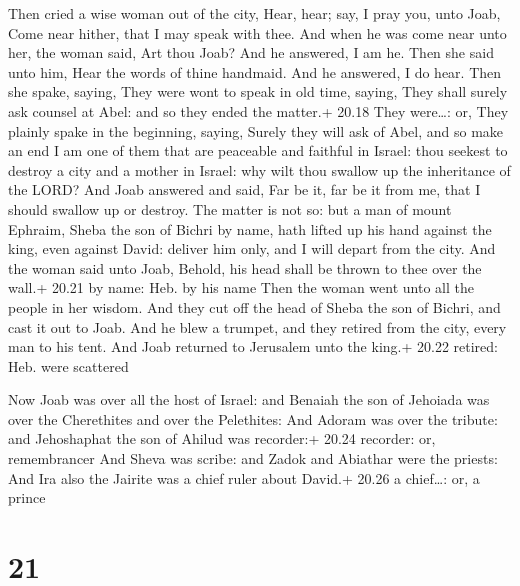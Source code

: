  Then cried a wise woman out of the city, Hear, hear;
say, I pray you, unto Joab, Come near hither, that I may speak with
thee.  And when he was come near unto her, the woman said,
Art thou Joab? And he answered, I am he. Then she said unto him, Hear
the words of thine handmaid. And he answered, I do hear. 
Then she spake, saying, They were wont to speak in old time, saying,
They shall surely ask counsel at Abel: and so they ended the matter.+
20.18 They were\ldots: or, They plainly spake in the beginning, saying,
Surely they will ask of Abel, and so make an end  I am one
of them that are peaceable and faithful in Israel: thou seekest to
destroy a city and a mother in Israel: why wilt thou swallow up the
inheritance of the LORD?  And Joab answered and said, Far
be it, far be it from me, that I should swallow up or destroy.
 The matter is not so: but a man of mount Ephraim, Sheba
the son of Bichri by name, hath lifted up his hand against the king,
even against David: deliver him only, and I will depart from the city.
And the woman said unto Joab, Behold, his head shall be thrown to thee
over the wall.+ 20.21 by name: Heb. by his name  Then the
woman went unto all the people in her wisdom. And they cut off the head
of Sheba the son of Bichri, and cast it out to Joab. And he blew a
trumpet, and they retired from the city, every man to his tent. And Joab
returned to Jerusalem unto the king.+ 20.22 retired: Heb. were scattered

 Now Joab was over all the host of Israel: and Benaiah
the son of Jehoiada was over the Cherethites and over the Pelethites:
 And Adoram was over the tribute: and Jehoshaphat the son
of Ahilud was recorder:+ 20.24 recorder: or, remembrancer 
And Sheva was scribe: and Zadok and Abiathar were the priests:
 And Ira also the Jairite was a chief ruler about David.+
20.26 a chief\ldots: or, a prince

\hypertarget{section-20}{%
\section{21}\label{section-20}}

